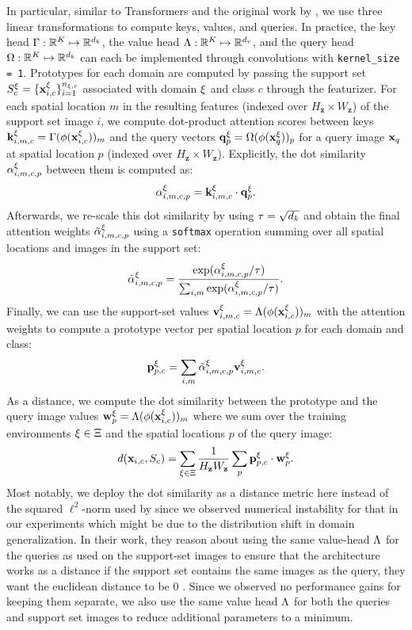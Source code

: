 In particular, similar to Transformers \citep{VaswaniSPUJGKP17} and the original work by \citet{DoerschGZ20}, we use three linear transformations to compute keys, values, and queries. In practice, the key head $\Gamma : \mathbb{R}^{K} \mapsto \mathbb{R}^{d_{k}}$, the value head $\Lambda : \mathbb{R}^{K} \mapsto \mathbb{R}^{d_{v}}$, and the query head $\Omega : \mathbb{R}^{K} \mapsto \mathbb{R}^{d_{k}}$  can each be implemented through convolutions with \texttt{kernel\_size = 1}. Prototypes for each domain are computed by passing the support set $S_c^\xi = \{\mathbf{x}_{i,c}^\xi\}_{i=1}^{n_{\xi, c}}$ associated with domain $\xi$ and class $c$ through the featurizer. For each spatial location $m$ in the resulting features (indexed over $H_\mathbf{z} \times W_\mathbf{z}$) of the support set image $i$, we compute dot-product attention scores between keys $\mathbf{k}_{i,m,c}^\xi = \Gamma (\phi(\mathbf{x}_{i,c}^\xi))_m$ and the query vectors $\mathbf{q}^\xi_{p} = \Omega(\phi(\mathbf{x}_{q}^\xi))_p$ for a query image $\mathbf{x}_{q}$ at spatial location $p$ (indexed over $H_\mathbf{z} \times W_\mathbf{z}$). Explicitly, the dot similarity $\alpha_{i,m,c,p}^\xi$ between them is computed as:
\begin{equation}
    \alpha_{i,m,c,p}^\xi = \mathbf{k}_{i,m,c}^\xi \cdot \mathbf{q}^\xi_{p}.
\end{equation}
Afterwards, we re-scale this dot similarity by using $\tau=\sqrt{d_{k}}$ and obtain the final attention weights $\Tilde{\alpha}_{i,m,c,p}^\xi$ using a \texttt{softmax} operation summing over all spatial locations and images in the support set:
\begin{equation}
    \Tilde{\alpha}_{i,m,c,p}^\xi = \frac{\exp(\alpha_{i,m,c,p}^\xi / \tau)}{\sum_{i,m} \exp(\alpha_{i,m,c,p}^\xi / \tau)}.
\end{equation}
Finally, we can use the support-set values $\mathbf{v}_{i,m,c}^\xi = \Lambda(\phi(\mathbf{x}_{i,c}^\xi))_m$  with the attention weights to compute a prototype vector per spatial location $p$ for each domain and class:
\begin{equation}
    \mathbf{p}_{p, c}^\xi = \sum_{i,m} \Tilde{\alpha}_{i,m,c,p}^\xi \mathbf{v}_{i,m,c}^\xi.
\end{equation}
As a distance, we compute the dot similarity between the prototype and the query image values $\mathbf{w}_{p}^\xi = \Lambda(\phi(\mathbf{x}_{i,c}^\xi))_m$ where we sum over the training environments $\xi \in \Xi$ and the spatial locations $p$ of the query image:
\begin{equation}
    d(\mathbf{x}_{i,c}, S_c) = \sum_{\xi \in \Xi} \frac{1}{H_\mathbf{z} W_\mathbf{z}} \sum_p \mathbf{p}_{p, c}^\xi \cdot  \mathbf{w}_{p}^\xi.
\end{equation}
Most notably, we deploy the dot similarity as a distance metric here instead of the squared $\ell^2$-norm used by \citet{DoerschGZ20} since we observed numerical instability for that in our experiments which might be due to the distribution shift in domain generalization. In their work, they reason about using the same value-head $\Lambda$ for the queries as used on the support-set images to ensure that the architecture works as a distance \ie if the support set contains the same images as the query, they want the euclidean distance to be $0$ \citep{DoerschGZ20}. Since we observed no performance gains for keeping them separate, we also use the same value head $\Lambda$ for both the queries and support set images to reduce additional parameters to a minimum.


